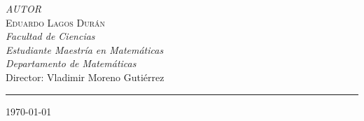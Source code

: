 \begin{titlepage}
{\small\itshape AUTOR}\\[0.1cm]

{\Large\scshape\color{azultesis}
Eduardo Lagos Durán
}\\[0.1cm]

{\itshape Facultad de Ciencias}\\[0.1cm]

{\itshape Estudiante Maestría en Matemáticas}\\[0.1cm]

{\itshape Departamento de Matemáticas}\\[1cm]


{\large
Director: Vladimir Moreno Gutiérrez
}

\vspace{0.2cm}

\rule{6cm}{0.4pt}

\vspace{0.5cm}


{\large \today}

\vfill

\end{titlepage}